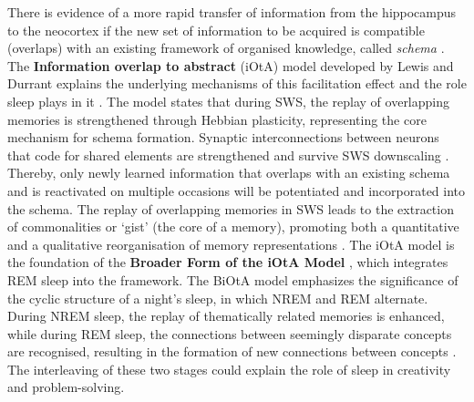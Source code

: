 There is evidence of a more rapid transfer of information from the hippocampus to the neocortex if the new set of information to be acquired is compatible (overlaps) with an existing framework of organised knowledge, called \textit{schema} \parencite{tse_schemas_2007,van_kesteren_persistent_2010,van_kesteren_retrieval_2010}. The \textbf{Information overlap to abstract} (iOtA) model developed by Lewis and Durrant explains the underlying mechanisms of this facilitation effect and the role sleep plays in it \parencite{lewis_overlapping_2011}. The model states that during SWS, the replay of overlapping memories is strengthened through Hebbian plasticity, representing the core mechanism for schema formation. Synaptic interconnections between neurons that code for shared elements are strengthened and survive SWS downscaling \parencite{abbott_synaptic_2000,lewis_overlapping_2011, tononi_sleep_2003,tononi_sleep_2006}. Thereby, only newly learned information that overlaps with an existing schema and is reactivated on multiple occasions will be potentiated and incorporated into the schema. The replay of overlapping memories in SWS leads to the extraction of commonalities or ‘gist’ (the core of a memory), promoting both a quantitative and a qualitative reorganisation of memory representations \parencite{durrant_sleep-dependent_2011,ellenbogen_human_2007,lewis_overlapping_2011}. The iOtA model is the foundation of the \textbf{Broader Form of the iOtA Model} \parencite[BiOtA]{lewis_how_2018}, which integrates REM sleep into the framework. The BiOtA model emphasizes the significance of the cyclic structure of a night’s sleep, in which NREM and REM alternate. During NREM sleep, the replay of thematically related memories is enhanced, while during REM sleep, the connections between seemingly disparate concepts are recognised, resulting in the formation of new connections between concepts \parencite[Figure \ref{fig:biota};][]{lewis_how_2018}. The interleaving of these two stages could explain the role of sleep in creativity and problem-solving. 
\vspace{1cm}
